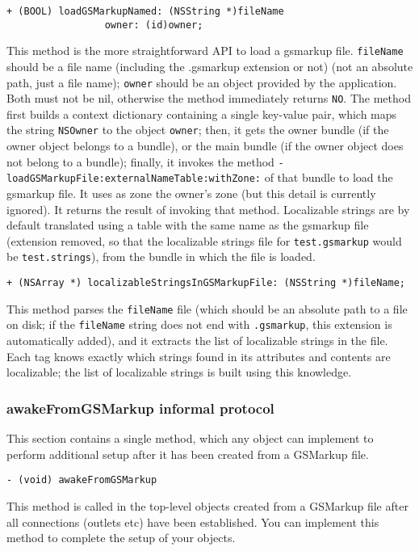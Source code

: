 \begin{verbatim}
+ (BOOL) loadGSMarkupNamed: (NSString *)fileName
                 owner: (id)owner;
\end{verbatim}
This method is the more straightforward API to load a gsmarkup file.
\texttt{fileName} should be a file name (including the .gsmarkup
extension or not) (not an absolute path, just a file name);
\texttt{owner} should be an object provided by the application.  Both
must not be nil, otherwise the method immediately returns \texttt{NO}.
The method first builds a context dictionary containing a single
key-value pair, which maps the string \texttt{NSOwner} to the object
\texttt{owner}; then, it gets the owner bundle (if the owner object
belongs to a bundle), or the main bundle (if the owner object does not
belong to a bundle); finally, it invokes the method
\texttt{-loadGSMarkupFile:externalNameTable:withZone:} of that bundle to load
the gsmarkup file.  It uses as zone the owner's zone (but this detail is
currently ignored).  It returns the result of invoking that method.
Localizable strings are by default translated using a table with the
same name as the gsmarkup file (extension removed, so that the localizable
strings file for \texttt{test.gsmarkup} would be \texttt{test.strings}),
from the bundle in which the file is loaded.

\begin{verbatim}
+ (NSArray *) localizableStringsInGSMarkupFile: (NSString *)fileName;
\end{verbatim}
This method parses the \texttt{fileName} file (which should be an
absolute path to a file on disk; if the \texttt{fileName} string does
not end with \texttt{.gsmarkup}, this extension is automatically added),
and it extracts the list of localizable strings in the file.  Each tag
knows exactly which strings found in its attributes and contents are
localizable; the list of localizable strings is built using this
knowledge.

\subsubsection{awakeFromGSMarkup informal protocol}
This section contains a single method, which any object can implement
to perform additional setup after it has been created from a GSMarkup
file.
\begin{verbatim}
- (void) awakeFromGSMarkup
\end{verbatim}
This method is called in the top-level objects created from a GSMarkup
file after all connections (outlets etc) have been established.  You
can implement this method to complete the setup of your objects.


